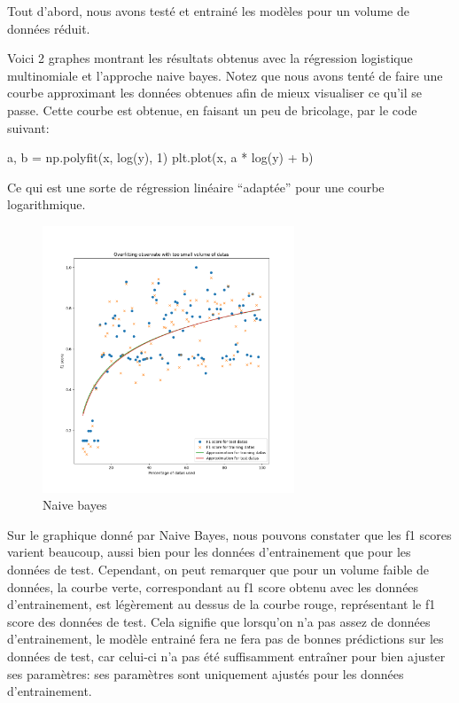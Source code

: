 \documentclass[
]{article}
\newenvironment{Shaded}{}{}
\newcommand{\DecValTok}[1]{\textcolor[rgb]{0.25,0.63,0.44}{#1}}
\newcommand{\NormalTok}[1]{#1}
\newcommand{\OperatorTok}[1]{\textcolor[rgb]{0.40,0.40,0.40}{#1}}
\begin{document}
Tout d'abord, nous avons testé et entrainé les modèles pour un volume de
données réduit.

Voici 2 graphes montrant les résultats obtenus avec la régression
logistique multinomiale et l'approche naive bayes. Notez que nous avons
tenté de faire une courbe approximant les données obtenues afin de mieux
visualiser ce qu'il se passe. Cette courbe est obtenue, en faisant un
peu de bricolage, par le code suivant:

\begin{Shaded}
\begin{Highlighting}[]
\NormalTok{a, b }\OperatorTok{=}\NormalTok{ np.polyfit(x, log(y), }\DecValTok{1}\NormalTok{)}
\NormalTok{plt.plot(x, a }\OperatorTok{*}\NormalTok{ log(y) }\OperatorTok{+}\NormalTok{ b)}
\end{Highlighting}
\end{Shaded}

Ce qui est une sorte de régression linéaire ``adaptée'' pour une courbe
logarithmique.

\begin{figure}
\centering
\includegraphics[width=0.67\textwidth,height=\textheight]{../res/overfitting_naive.png}
\caption{Naive bayes}
\end{figure}

\newpage

Sur le graphique donné par Naive Bayes, nous pouvons constater que les
f1 scores varient beaucoup, aussi bien pour les données d'entrainement
que pour les données de test. Cependant, on peut remarquer que pour un
volume faible de données, la courbe verte, correspondant au f1 score
obtenu avec les données d'entrainement, est légèrement au dessus de la
courbe rouge, représentant le f1 score des données de test. Cela
signifie que lorsqu'on n'a pas assez de données d'entrainement, le
modèle entrainé fera ne fera pas de bonnes prédictions sur les données
de test, car celui-ci n'a pas été suffisamment entraîner pour bien
ajuster ses paramètres: ses paramètres sont uniquement ajustés pour les
données d'entrainement.
\end{document}
